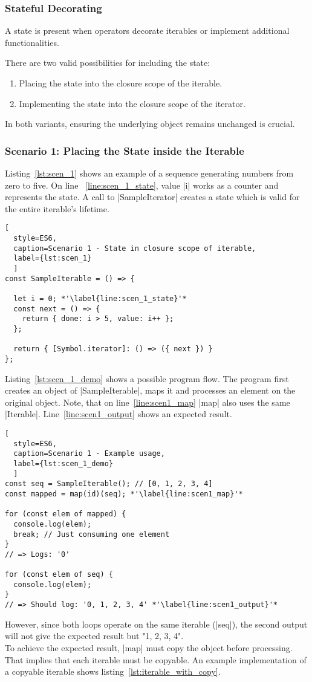 \subsubsection{Stateful Decorating}
\label{subsub:Stateful Decorating}
A state is present when operators decorate iterables or implement 
additional functionalities. 

There are two valid possibilities for including the state:
\begin{enumerate}
  \item Placing the state into the closure scope of the iterable.
  \item Implementing the state into the closure scope of the iterator.
\end{enumerate}
In both variants, ensuring the underlying object remains unchanged is crucial.

\subsubsection{Scenario 1: Placing the State inside the Iterable}
\label{subsub:Scenario 1}
Listing~\ref{lst:scen_1} shows an example of a sequence generating numbers from
zero to five. On line ~\ref{line:scen_1_state}, value |i| works as a counter 
and represents the state. 
A call to |SampleIterator| creates a state which is valid for the entire 
iterable's lifetime.

\begin{lstlisting}[
  style=ES6, 
  caption=Scenario 1 - State in closure scope of iterable,
  label={lst:scen_1}
  ]
const SampleIterable = () => {

  let i = 0; *'\label{line:scen_1_state}'*
  const next = () => {
    return { done: i > 5, value: i++ };
  };

  return { [Symbol.iterator]: () => ({ next }) }
};
\end{lstlisting}

Listing~\ref{lst:scen_1_demo} shows a possible program flow. The program first
creates an object of |SampleIterable|, maps it and processes an element on the
original object. Note, that on line~\ref{line:scen1_map} |map| also uses the
same |Iterable|. Line~\ref{line:scen1_output} shows an expected result.

\begin{lstlisting}[
  style=ES6, 
  caption=Scenario 1 - Example usage,
  label={lst:scen_1_demo}
  ]
const seq = SampleIterable(); // [0, 1, 2, 3, 4]
const mapped = map(id)(seq); *'\label{line:scen1_map}'*

for (const elem of mapped) {
  console.log(elem);
  break; // Just consuming one element
}
// => Logs: '0'

for (const elem of seq) {
  console.log(elem);
}
// => Should log: '0, 1, 2, 3, 4' *'\label{line:scen1_output}'*
\end{lstlisting}
However, since both loops operate on the same iterable (|seq|), the second output
will not give the expected result but "1, 2, 3, 4".\\
To achieve the expected result, |map| must copy the object before processing.
That implies that each iterable must be copyable. An example implementation
of a copyable iterable shows listing~\ref{lst:iterable_with_copy}.

